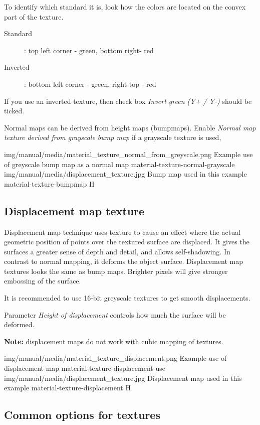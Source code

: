 To identify which standard it is, look how the colors are located on the convex part of the texture.
\begin{description}
\item[Standard]: top left corner - green, bottom right- red
\item[Inverted]: bottom left corner - green, right top - red
\end{description}
If you use an inverted texture, then check box  \emph{Invert green (Y+ / Y-)}  should be ticked.

Normal maps can be derived from height maps (bumpmaps). Enable \emph{Normal map texture derived from grayscale bump map} if a grayscale texture is used,

\twoImagesWithTwoCaptionsFullWidth
{img/manual/media/material_texture_normal_from_greyscale.png}
{Example use of greyscale bump map as a normal map}
{material-texture-normal-grayscale}
{img/manual/media/displacement_texture.jpg}
{Bump map used in this example}
{material-texture-bumpmap}
{H}

\subsection{Displacement map texture}\label{materials-texture-displacement}

Displacement map technique uses texture to cause an effect where the actual geometric position of points over the textured surface are displaced. It gives the surfaces a greater sense of depth and detail, and allows self-shadowing. In contrast to normal mapping, it deforms the object surface.
Displacement map textures looks the same as bump maps. Brighter pixels will give stronger embossing of the surface.

It is recommended to use 16-bit greyscale textures to get smooth displacements.

Parameter \emph{Height of displacement} controls how much the surface will be deformed.

\textbf{Note:} displacement maps do not work with cubic mapping of textures.

\twoImagesWithTwoCaptionsFullWidth
{img/manual/media/material_texture_displacement.png}
{Example use of displacement map}
{material-texture-displacement-use}
{img/manual/media/displacement_texture.jpg}
{Displacement map used in this example}
{material-texture-displacement}
{H}

\subsection{Common options for textures}\label{materials-textures}

